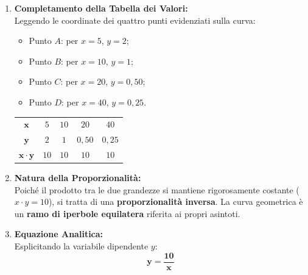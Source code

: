 \documentclass[11pt,a4paper,oneside]{report}
\begin{document}
\begin{metodo}
\begin{enumerate}[label=\alph*)]
  \item \textbf{Completamento della Tabella dei Valori:}\\
  Leggendo le coordinate dei quattro punti evidenziati sulla curva:
  \begin{itemize}
    \item Punto $A$: per $x = 5$, $y = 2$;
    \item Punto $B$: per $x = 10$, $y = 1$;
    \item Punto $C$: per $x = 20$, $y = 0{,}50$;
    \item Punto $D$: per $x = 40$, $y = 0{,}25$.
  \end{itemize}
  \begin{center}
  \begin{tabular}{ccccc}
  \toprule
  $\mathbf{x}$ & $5$ & $10$ & $20$ & $40$ \\
  $\mathbf{y}$ & $2$ & $1$ & $0{,}50$ & $0{,}25$ \\
  $\mathbf{x \cdot y}$ & $10$ & $10$ & $10$ & $10$ \\
  \bottomrule
  \end{tabular}
  \end{center}

  \item \textbf{Natura della Proporzionalit\`a:}\\
  Poich\'e il prodotto tra le due grandezze si mantiene rigorosamente costante ($x \cdot y = 10$), si tratta di una \textbf{proporzionalit\`a inversa}. La curva geometrica \`e un \textbf{ramo di iperbole equilatera} riferita ai propri asintoti.

  \item \textbf{Equazione Analitica:}\\
  Esplicitando la variabile dipendente $y$:
  \[
  \mathbf{\boxed{y = \frac{10}{x}}}
  \]
\end{enumerate}
\end{metodo}
\end{document}
